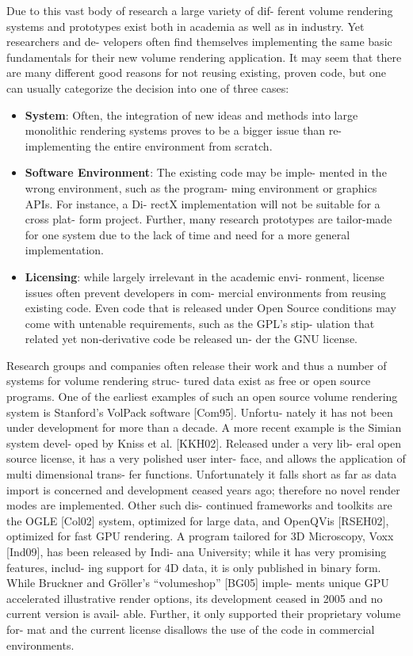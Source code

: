 Due to this vast body of research a large variety of dif-
ferent volume rendering systems and prototypes exist both
in academia as well as in industry. Yet researchers and de-
velopers often find themselves implementing the same basic
fundamentals for their new volume rendering application. It
may seem that there are many different good reasons for not
reusing existing, proven code, but one can usually categorize
the decision into one of three cases:

\begin{itemize}

  \item \textbf{System}:
	Often, the integration of new ideas and methods
	into large monolithic rendering systems proves to be a
	bigger issue than re-implementing the entire environment
	from scratch.

	\item \textbf{Software Environment}: The existing code may be imple-
	mented in the wrong environment, such as the program-
	ming environment or graphics APIs. For instance, a Di-
	rectX implementation will not be suitable for a cross plat-
	form project. Further, many research prototypes are tailor-made
	for one system due to the lack of time and need for
	a more general implementation.

	\item \textbf{Licensing}: while largely irrelevant in the academic envi-
	ronment, license issues often prevent developers in com-
	mercial environments from reusing existing code. Even
	code that is released under Open Source conditions may
	come with untenable requirements, such as the GPL’s stip-
	ulation that related yet non-derivative code be released un-
	der the GNU license.

\end{itemize}

Research groups and companies often release their work
and thus a number of systems for volume rendering struc-
tured data exist as free or open source programs. One of the
earliest examples of such an open source volume rendering
system is Stanford’s VolPack software [Com95]. Unfortu-
nately it has not been under development for more than a
decade. A more recent example is the Simian system devel-
oped by Kniss et al. [KKH02]. Released under a very lib-
eral open source license, it has a very polished user inter-
face, and allows the application of multi dimensional trans-
fer functions. Unfortunately it falls short as far as data import
is concerned and development ceased years ago; therefore
no novel render modes are implemented. Other such dis-
continued frameworks and toolkits are the OGLE [Col02]
system, optimized for large data, and OpenQVis [RSEH02],
optimized for fast GPU rendering. A program tailored for
3D Microscopy, Voxx [Ind09], has been released by Indi-
ana University; while it has very promising features, includ-
ing support for 4D data, it is only published in binary form.
While Bruckner and Gröller’s “volumeshop” [BG05] imple-
ments unique GPU accelerated illustrative render options, its
development ceased in 2005 and no current version is avail-
able. Further, it only supported their proprietary volume for-
mat and the current license disallows the use of the code in
commercial environments.

